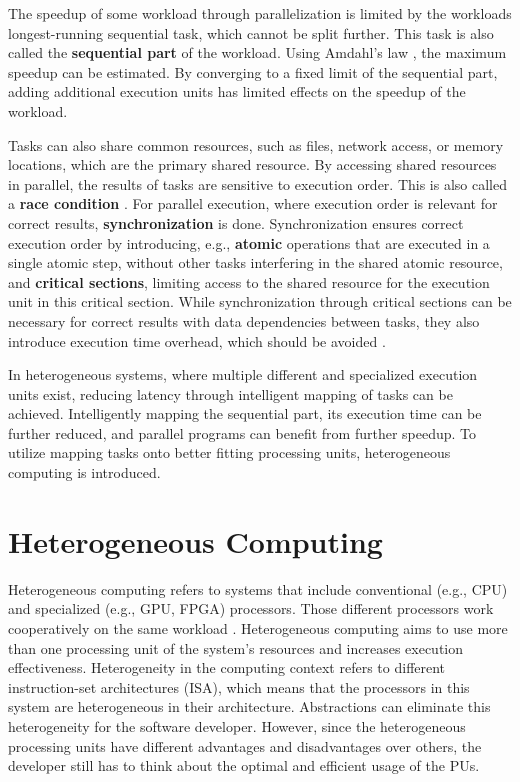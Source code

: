 The speedup of some workload through parallelization is limited by the workloads longest-running sequential task, which cannot be split further. This task is also called the \textbf{sequential part} of the workload. Using Amdahl's law \cite{amdahlValiditySingleProcessor1967}, the maximum speedup can be estimated. By converging to a fixed limit of the sequential part, adding additional execution units has limited effects on the speedup of the workload.

Tasks can also share common resources, such as files, network access, or memory locations, which are the primary shared resource. By accessing shared resources in parallel, the results of tasks are sensitive to execution order. This is also called a \textbf{race condition} \cite{dijkstraCooperatingSequentialProcesses2002}. For parallel execution, where execution order is relevant for correct results, \textbf{synchronization} is done. Synchronization ensures correct execution order by introducing, e.g., \textbf{atomic} operations that are executed in a single atomic step, without other tasks interfering in the shared atomic resource, and \textbf{critical sections}, limiting access to the shared resource for the execution unit in this critical section. While synchronization through critical sections can be necessary for correct results with data dependencies between tasks, they also introduce execution time overhead, which should be avoided \cite{breshearsArtConcurrencyThread2009, shoshaniSequencingTasksMultiprocess1970}.

In heterogeneous systems, where multiple different and specialized execution units exist, reducing latency through intelligent mapping of tasks can be achieved. Intelligently mapping the sequential part, its execution time can be further reduced, and parallel programs can benefit from further speedup. To utilize mapping tasks onto better fitting processing units, heterogeneous computing is introduced.

\section{Heterogeneous Computing}
Heterogeneous computing refers to systems that include conventional (e.g., CPU) and specialized (e.g., GPU, FPGA) processors. Those different processors work cooperatively on the same workload \cite{shanHeterogeneousProcessingStrategy2006}. Heterogeneous computing aims to use more than one processing unit of the system's resources and increases execution effectiveness. Heterogeneity in the computing context refers to different instruction-set architectures (ISA), which means that the processors in this system are heterogeneous in their architecture.
Abstractions can eliminate this heterogeneity for the software developer. However, since the heterogeneous processing units have different advantages and disadvantages over others, the developer still has to think about the optimal and efficient usage of the PUs.

